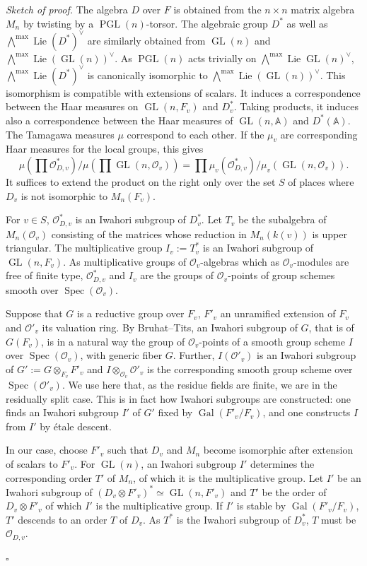 \documentclass[10pt]{article}
\newcommand{\Adele}{\mathbb A}
\newcommand{\GL}{\operatorname{GL}}
\newcommand{\PGL}{\operatorname{PGL}}
\newcommand{\Gal}{\operatorname{Gal}}
\newcommand{\Spec}{\operatorname{Spec}}
\newcommand{\Lie}{\operatorname{Lie}}
\newcommand{\OO}{\mathcal O}
\theoremstyle{deligne}
\newenvironment{sketchproof}[1][Sketch of proof.]{\textit{#1}}{\hfill$\square$}
\begin{document}
\begin{sketchproof}
The algebra $D$ over $F$ is obtained from the $n\times n$ matrix algebra $M_n$ by twisting by a $\PGL(n)$-torsor. The algebraic group $D^*$ as well as $\bigwedge^{\max}\Lie(D^*)^\vee$ are similarly obtained from $\GL(n)$ and $\bigwedge^{\max}\Lie(\GL(n))^\vee$. As $\PGL(n)$ acts trivially on $\bigwedge^{\max}\Lie\GL(n)^\vee$, $\bigwedge^{\max}\Lie(D^*)^\vee$ is canonically isomorphic to $\bigwedge^{\max}\Lie(\GL(n))^\vee$. This isomorphism is compatible with extensions of scalars. It induces a correspondence between the Haar measures on $\GL(n,F_v)$ and $D_v^*$. Taking products, it induces also a correspondence between the Haar measures of $\GL(n,\Adele)$ and $D^*(\Adele)$. The Tamagawa measures $\mu$ correspond to each other. If the $\mu_v$ are corresponding Haar measures for the local groups, this gives
\begin{equation}\tag{3.11.4}
\mu\left(\prod\mathcal O_{D,v}^*\right)/\mu\left(\prod\GL(n,\OO_v)\right)=\prod \mu_v(\mathcal O_{D,v}^*)/\mu_v(\GL(n,\OO_v)).
\end{equation}
It suffices to extend the product on the right only over the set $S$ of places where $D_v$ is not isomorphic to $M_n(F_v)$.

For $v\in S$, $\mathcal O_{D,v}^*$ is an Iwahori subgroup of $D_v^*$. Let $T_v$ be the subalgebra of $M_n(\OO_v)$ consisting of the matrices whose reduction in $M_n(k(v))$ is upper triangular. The multiplicative group $I_v:=T_v^*$ is an Iwahori subgroup of $\GL(n,F_v)$. As multiplicative groups of $\OO_v$-algebras which as $\OO_v$-modules are free of finite type, $\mathcal O_{D,v}^*$ and $I_v$ are the groups of $\OO_v$-points of group schemes smooth over $\Spec(\OO_v)$.

Suppose that $G$ is a reductive group over $F_v$, $F'_v$ an unramified extension of $F_v$ and $\OO'_v$ its valuation ring. By Bruhat--Tits, an Iwahori subgroup of $G$, that is of $G(F_v)$, is in a natural way the group of $\OO_v$-points of a smooth group scheme $I$ over $\Spec(\OO_v)$, with generic fiber $G$. Further, $I(\OO'_v)$ is an Iwahori subgroup of $G':=G\otimes_{F_v}F'_v$ and $I\otimes_{\OO_v}\OO'_v$ is the corresponding smooth group scheme over $\Spec(\OO'_v)$. We use here that, as the residue fields are finite, we are in the residually split case. This is in fact how Iwahori subgroups are constructed: one finds an Iwahori subgroup $I'$ of $G'$ fixed by $\Gal(F'_v/F_v)$, and one constructs $I$ from $I'$ by \'{e}tale descent.

In our case, choose $F'_v$ such that $D_v$ and $M_n$ become isomorphic after extension of scalars to $F'_v$. For $\GL(n)$, an Iwahori subgroup $I'$ determines the corresponding order $T'$ of $M_n$, of which it is the multiplicative group. Let $I'$ be an Iwahori subgroup of $(D_v\otimes F'_v)^*\simeq\GL(n,F'_v)$ and $T'$ be the order of $D_v\otimes F'_v$ of which $I'$ is the multiplicative group. If $I'$ is stable by $\Gal(F'_v/F_v)$, $T'$ descends to an order $T$ of $D_v$. As $T^*$ is the Iwahori subgroup of $D_v^*$, $T$ must be $\mathcal O_{D,v}$.


\end{sketchproof}
\end{document}
